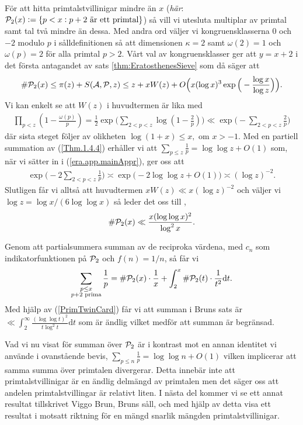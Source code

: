 För att hitta primtalstvillinigar mindre än $x$ (\textit{här}: \( \P_2(x) := \{p < x : p + 2 \text{ är ett primtal}\}\)) så vill vi utesluta multiplar av primtal samt tal två mindre än dessa. Med andra ord väljer vi kongruensklasserna $0$ och $-2$ modulo $p$ i sålldefinitionen så att dimensionen \(\kappa = 2\) samt \(\omega(2) = 1\) och \(\omega(p) = 2\) för alla primtal $p > 2$. Vårt val av kongruensklasser ger att \(y = x + 2\) i det första antagandet av sats \ref{thm:EratosthenesSieve} som då säger att
\begin{align*}
    \card{\P_2(x)} \leq \pi(z) + \S{A}{P}{z} \leq z + x W(z) + O\Big(x (\log x)^3 \exp \Big( - \frac{\log x}{\log z} \Big) \Big).
\end{align*}
Vi kan enkelt se att \(W(z)\) i huvudtermen är lika med
\begin{align}
    \prod_{p < z}\left( 1 - \frac{\omega(p)}{p} \right) = \frac{1}{2} \exp \Bigg( \sum_{2 <p < z} \log \left( 1 - \frac{2}{p} \right) \Bigg) \ll \exp \Bigg( - \sum_{2 <p < z} \frac{2}{p}  \Bigg) \label{era.app.mainAppr}
\end{align}
där sista steget följer av olikheten \(\log(1 + x) \leq x, \text{ om } x > -1\). Med en partiell summation av (\ref{Thm.1.4.4}) erhåller vi att \(\sum_{p \leq z} \frac{1}{p} = \log \log z + O(1)\) som, när vi sätter in i (\ref{era.app.mainAppr}), ger oss att
\begin{align} \label{era.app.secondMainAppr} 
    \exp \Bigg( - 2 \sum_{2 <p < z} \frac{1}{p}  \Bigg) \asymp \exp \big( -2 \log \log z + O(1)  \big) \asymp (\log z)^{-2}.
\end{align}
Slutligen får vi alltså att huvudtermen \(x W(z) \ll x (\log z)^{-2}\) och väljer vi \(\log z = \log x / (6 \log \log x)\) så leder det oss till \cite[Sats 5.4.4]{cojocarumurty}, 
\begin{align} \label{PrimTwinCard}
    \card{\P_2(x)} \ll \frac{x (\log \log x)^2}{\log^2 x} .
\end{align}

Genom att partialsummera summan av de reciproka värdena, med \(c_n\) som indikatorfunktionen på \(\P_2\) och \(f(n) = 1 / n\), så får vi 
\begin{align*}
    \sum_{\substack{p \leq x \\ p + 2 \text{ prima}}} \frac{1}{p} = \card{\P_2(x)} \cdot \frac{1}{x} + \int_2^x \card{\P_2(t)} \cdot \frac{1}{t^2} \text{d}t . 
\end{align*}
Med hjälp av (\ref{PrimTwinCard}) får vi att summan i Bruns sats är \(\ll \int_2^\infty \frac{(\log \log t)^2}{t \log^2 t} \text{d}t\) som är ändlig vilket medför att summan är begränsad. 

Vad vi nu visat för summan över \(\P_2\) är i kontrast mot en annan identitet vi använde i ovanstående bevis, \(\sum_{p \leq n} \frac{1}{p} = \log \log n + O(1)\) vilken implicerar att samma summa över primtalen divergerar. Detta innebär inte att primtalstvillinigar är en ändlig delmängd av primtalen men det säger oss att andelen primtalstvillingar är relativt liten. I nästa del kommer vi se ett annat resultat tillskrivet Viggo Brun, Bruns såll, och med hjälp av detta visa ett resultat i motsatt riktning för en mängd snarlik mängden primtalstvillinigar. 